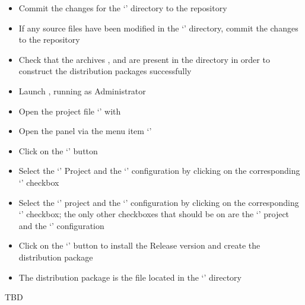 \begin{itemize}
\item Commit the changes for the `' directory to the
 repository
\item\exSp{}If any source files have been modified in the
`' directory, commit the changes to the
 repository
\item\exSp{}Check that the archives ,
 and  are present in the
 directory in order to construct the
distribution packages successfully
\item\exSp{}Launch , running as Administrator
\item\exSp{}Open the project file
`' with
\item\exSp{}Open the  panel via the menu item
`'
\item\exSp{}Click on the `' button
\item\exSp{}Select the `' Project and the `'
configuration by clicking on the corresponding `' checkbox
\item\exSp{}Select the `' project and the `'
configuration by clicking on the corresponding `' checkbox; the only other
checkboxes that should be on are the `' project and the
`' configuration
\item\exSp{}Click on the `' button to install the Release version and create
the distribution package
\item\exSp{}The distribution package is the  file located in
the `' directory
\end{itemize}
\tertiaryEnd
{}
TBD
\tertiaryEnd
\secondaryEnd
\appendixEnd{}
